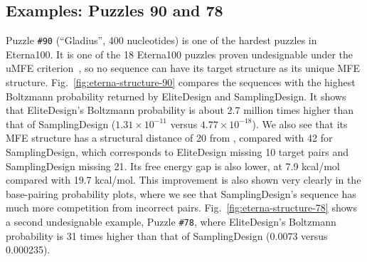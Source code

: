 \subsection{Examples: Puzzles 90 and 78}\label{sec:example}


Puzzle \texttt{\#90} (``Gladius'', 400 nucleotides) is one of the hardest puzzles in Eterna100. It is one of the 18 Eterna100 puzzles proven undesignable under the uMFE criterion~\citep{zhou2024undesign,tang2026}, so no sequence can have its target structure \vecystar as its unique MFE structure. Fig.~\ref{fig:eterna-structure-90} compares the sequences with the highest Boltzmann probability returned by EliteDesign and SamplingDesign. It shows that EliteDesign's Boltzmann probability is about 2.7 million times higher than that of SamplingDesign ($1.31\times10^{-11}$ versus $4.77\times10^{-18}$). We also see that its MFE structure has a structural distance of 20 from \vecystar, compared with 42 for SamplingDesign, which corresponds to EliteDesign missing 10 target pairs and SamplingDesign missing 21. Its free energy gap is also lower, at 7.9 kcal/mol compared with 19.7 kcal/mol. This improvement is also shown very clearly in the base-pairing probability plots, where we see that SamplingDesign's sequence has much more competition from incorrect pairs. Fig.~\ref{fig:eterna-structure-78} shows a second undesignable example, Puzzle \texttt{\#78}, where EliteDesign's Boltzmann probability is 31 times higher than that of SamplingDesign (0.0073 versus 0.000235).
